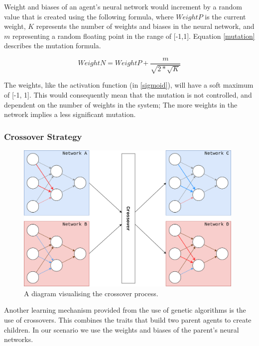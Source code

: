 \documentclass[12pt,a4paper]{article}
\begin{document}
            Weight and biases of an agent's neural network would increment by a random value that is created using the following formula, where $WeightP$ is the current weight, $K$ represents the number of weights and biases in the neural network, and $m$ representing a random floating point in the range of [-1,1]. Equation \ref{mutation} describes the mutation formula.

            \begin{equation} \label{mutation}
                WeightN = WeightP + \frac{m}{\sqrt{2 * \sqrt{K} }}
            \end{equation}

            The weights, like the activation function (in \ref{sigmoid}), will have a soft maximum of [-1, 1]. This would consequently mean that the mutation is not controlled, and dependent on the number of weights in the system; The more weights in the network implies a less significant mutation.

        \subsubsection{Crossover Strategy} \label{crossover_strategy}

                
            \begin{figure}
                \centering
                \includegraphics[width=110mm]{crossover.png}
                \caption{A diagram visualising the crossover process.\label{crossoverpic}}
            \end{figure}

            Another learning mechanism provided from the use of genetic algorithms is the use of crossovers. This combines the traits that build two parent agents to create children. In our scenario we use the weights and biases of the parent's neural networks.
\end{document}
